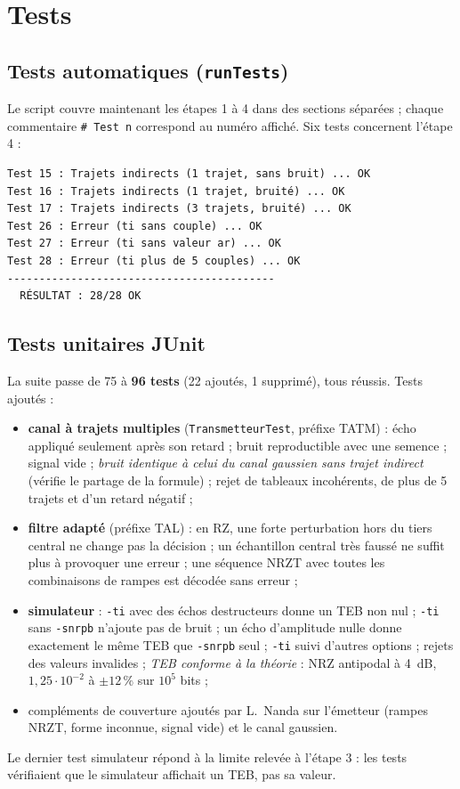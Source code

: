 \documentclass[11pt,a4paper]{article}
\newcommand{\cls}[1]{\texttt{#1}}
\begin{document}
\section{Tests}
\subsection{Tests automatiques (\texttt{runTests})}
Le script couvre maintenant les étapes 1 à 4 dans des sections séparées ; chaque commentaire \texttt{\# Test n} correspond au numéro affiché. Six tests concernent l'étape 4 :
\begin{lstlisting}[language={}]
Test 15 : Trajets indirects (1 trajet, sans bruit) ... OK
Test 16 : Trajets indirects (1 trajet, bruité) ... OK
Test 17 : Trajets indirects (3 trajets, bruité) ... OK
Test 26 : Erreur (ti sans couple) ... OK
Test 27 : Erreur (ti sans valeur ar) ... OK
Test 28 : Erreur (ti plus de 5 couples) ... OK
------------------------------------------
  RÉSULTAT : 28/28 OK
\end{lstlisting}

\subsection{Tests unitaires JUnit}
La suite passe de 75 à \textbf{96 tests} (22 ajoutés, 1 supprimé), tous réussis. Tests ajoutés :
\begin{itemize}
  \item \textbf{canal à trajets multiples} (\cls{TransmetteurTest}, préfixe TATM) : écho appliqué seulement après son retard ; bruit reproductible avec une semence ; signal vide ; \emph{bruit identique à celui du canal gaussien sans trajet indirect} (vérifie le partage de la formule) ; rejet de tableaux incohérents, de plus de 5 trajets et d'un retard négatif ;
  \item \textbf{filtre adapté} (préfixe TAL) : en RZ, une forte perturbation hors du tiers central ne change pas la décision ; un échantillon central très faussé ne suffit plus à provoquer une erreur ; une séquence NRZT avec toutes les combinaisons de rampes est décodée sans erreur ;
  \item \textbf{simulateur} : \texttt{-ti} avec des échos destructeurs donne un TEB non nul ; \texttt{-ti} sans \texttt{-snrpb} n'ajoute pas de bruit ; un écho d'amplitude nulle donne exactement le même TEB que \texttt{-snrpb} seul ; \texttt{-ti} suivi d'autres options ; rejets des valeurs invalides ; \emph{TEB conforme à la théorie} : NRZ antipodal à 4~dB, $1{,}25\cdot10^{-2}$ à $\pm 12\,\%$ sur $10^5$ bits ;
  \item compléments de couverture ajoutés par L.~Nanda sur l'émetteur (rampes NRZT, forme inconnue, signal vide) et le canal gaussien.
\end{itemize}
Le dernier test simulateur répond à la limite relevée à l'étape 3 : les tests vérifiaient que le simulateur affichait un TEB, pas sa valeur.
\end{document}
